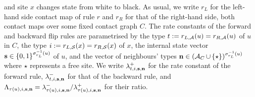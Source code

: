 and site $x$ changes state from white to black.
As usual, we write $r_L$ for the left-hand side contact map of rule $r$
and $r_R$ for that of the right-hand side,
both contact maps over some fixed contact graph $C$.
The rate constants of the forward and backward flip rules are parametrised
by the type $t := r_{L,\mathcal{A}}(u) = r_{R,\mathcal{A}}(u)$ of $u$ in $C$,
the type $i := r_{L,\mathcal{S}}(x) = r_{R,\mathcal{S}}(x)$ of $x$,
the internal state vector
$\boldsymbol{\mathbf{s}} \in \left\{ 0,1 \right\}^{\sigma_{r_L}^{-1}(u)}$ of $u$,
and the vector of neighbours' types
$\boldsymbol{\mathbf{n}} \in (\mathcal{A}_C \operatorname*{\cup} \left\{ \star \right\})^{\sigma_{r_L}^{-1}(u)}$
where $\star$ represents a free site.
We write $\lambda^+_{t,i,\boldsymbol{\mathbf{s}},\boldsymbol{\mathbf{n}}}$
for the rate constant of the forward rule,
$\lambda^-_{t,i,\boldsymbol{\mathbf{s}},\boldsymbol{\mathbf{n}}}$
for that of the backward rule,
and $\Lambda_{\tau(u),i,\boldsymbol{\mathbf{s}},\boldsymbol{\mathbf{n}}} =
\lambda^-_{\tau(u),i,\boldsymbol{\mathbf{s}},\boldsymbol{\mathbf{n}}}/
\lambda^+_{\tau(u),i,\boldsymbol{\mathbf{s}},\boldsymbol{\mathbf{n}}}$ for their ratio.

